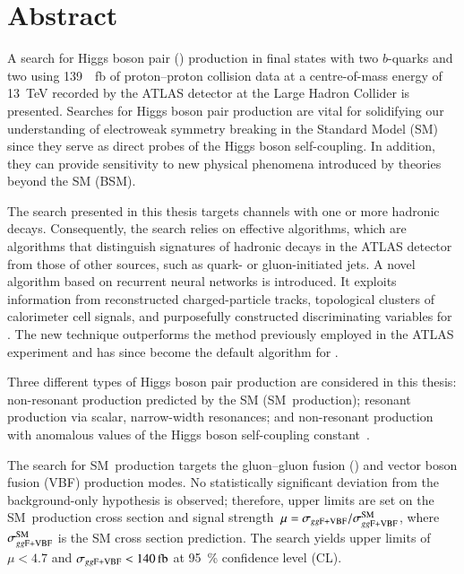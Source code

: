 \chapter*{Abstract}

A search for Higgs boson pair (\HH) production in final states with two
$b$-quarks and two \tauleptons using \SI{139}{\per\femto\barn} of proton--proton
collision data at a centre-of-mass energy of \SI{13}{\TeV} recorded by the ATLAS
detector at the Large Hadron Collider is presented. Searches for Higgs boson
pair production are vital for solidifying our understanding of electroweak
symmetry breaking in the Standard Model (SM) since they serve as direct probes
of the Higgs boson self-coupling. In addition, they can provide sensitivity to
new physical phenomena introduced by theories beyond the SM (BSM).

The search presented in this thesis targets channels with one or more hadronic
\taulepton decays. Consequently, the search relies on effective \tauid
algorithms, which are algorithms that distinguish signatures of hadronic
\taulepton decays in the ATLAS detector from those of other sources, such as
quark- or gluon-initiated jets. A novel \tauid algorithm based on recurrent
neural networks is introduced. It exploits information from reconstructed
charged-particle tracks, topological clusters of calorimeter cell signals, and
purposefully constructed discriminating variables for \tauid. The new technique
outperforms the method previously employed in the ATLAS experiment and has since
become the default algorithm for \tauid.

Three different types of Higgs boson pair production are considered in this
thesis: non-resonant \HH production predicted by the SM (SM~\HH production);
resonant \HH production via scalar, narrow-width resonances; and non-resonant
\HH production with anomalous values of the Higgs boson self-coupling
constant~\lambdahhh.

The search for SM~\HH production targets the gluon--gluon fusion (\ggF) and
vector boson fusion (VBF) production modes. No statistically significant
deviation from the background-only hypothesis is observed; therefore, upper
limits are set on the SM~\HH production cross section \xsecggfvbf and signal
strength~$\mu = \sigma_{gg\text{F+VBF}} / \sigma_{gg\text{F+VBF}}^{\text{SM}}$, where
$\sigma_{gg\text{F+VBF}}^{\text{SM}}$ is the SM cross section prediction. The search yields
upper limits of $\mu < \num{4.7}$ and $\xsecggfvbf < \SI{140}{\femto\barn}$ at
\SI{95}{\percent} confidence level (CL).

